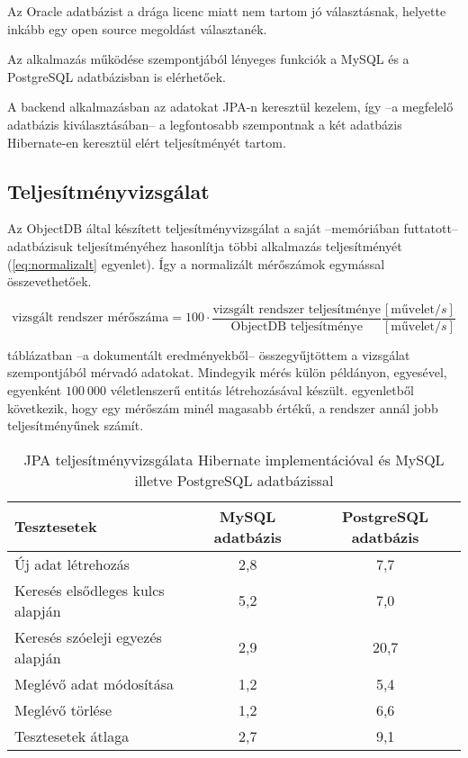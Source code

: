 Az Oracle adatbázist a drága licenc miatt nem tartom jó választásnak, helyette inkább egy open source megoldást választanék.

Az alkalmazás működése szempontjából lényeges funkciók a MySQL és a PostgreSQL adatbázisban is elérhetőek.

A backend alkalmazásban az adatokat JPA-n keresztül kezelem, így --a megfelelő adatbázis kiválasztásában-- a legfontosabb szempontnak a két adatbázis Hibernate-en keresztül elért teljesítményét tartom.

\subsection{Teljesítményvizsgálat}
Az ObjectDB által készített teljesítményvizsgálat\cite{JPA_benchmark} a saját --memóriában futtatott-- adatbázisuk teljesítményéhez hasonlítja többi alkalmazás teljesítményét (\ref{eq:normalizalt} egyenlet). Így a normalizált mérőszámok egymással összevethetőek.

\begin{equation}
\textrm{vizsgált rendszer mérőszáma} = 100 \cdot
\frac{\textrm{vizsgált rendszer teljesítménye}}{\textrm{ObjectDB teljesítménye}}
\frac{[\textrm{művelet}/s]}{[\textrm{művelet}/s]}
\label{eq:normalizalt}
\end{equation}

 táblázatban --a dokumentált eredményekből\cite{JPA_benchmark}-- összegyűjtöttem a vizsgálat szempontjából mérvadó adatokat. Mindegyik mérés külön példányon, egyesével, egyenként $100~000$ véletlenszerű entitás létrehozásával készült.  egyenletből következik, hogy egy mérőszám minél magasabb értékű, a rendszer annál jobb teljesítményűnek számít.

\begin{table}[hbt]
	
	\begin{tabular}{lc|c}
		Tesztesetek & MySQL adatbázis & PostgreSQL adatbázis \\\hline 
		
		Új adat létrehozás & 2,8 & 7,7\\ \hline
		Keresés elsődleges kulcs alapján  & 5,2 & 7,0\\ \hline
		Keresés szóeleji egyezés alapján & 2,9 & 20,7\\ \hline
		Meglévő adat módosítása & 1,2 & 5,4\\ \hline
		Meglévő törlése & 1,2 & 6,6 \\ \hline
		Tesztesetek átlaga & 2,7 & 9,1
	\end{tabular} 
	
	\caption{JPA teljesítményvizsgálata Hibernate implementációval és  MySQL illetve PostgreSQL adatbázissal }
	\label{tabl:teljesitmenyvizsgalat}
\end{table}

